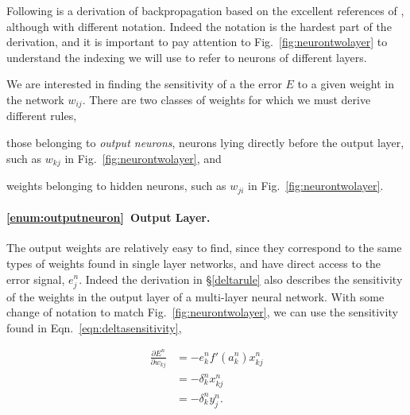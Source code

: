 \documentclass[thesis]{subfiles}
\begin{document}
Following is a derivation of backpropagation based on the excellent references of \citet{haykin1994neural,Bishop1995}, although with different notation. Indeed the notation is the hardest part of the derivation, and it is important to pay attention to Fig.~\ref{fig:neurontwolayer} to understand the indexing we will use to refer to neurons of different layers.

We are interested in finding the sensitivity of a the error $E$ to a given weight in the network $w_{ij}$. There are two classes of weights for which we must derive different rules, 
\begin{enumerate*}[label=(\textbf{\roman*})]
  \item \label{enum:outputneuron} those belonging to \emph{output neurons}, \ie neurons lying directly before the output layer, such as $w_{kj}$ in Fig.~\ref{fig:neurontwolayer}, and
  \item \label{enum:hiddenneuron} weights belonging to hidden neurons, such as $w_{ji}$ in Fig.~\ref{fig:neurontwolayer}.
\end{enumerate*}

\paragraph{\ref{enum:outputneuron}~Output Layer.}
The output weights are relatively easy to find, since they correspond to the same types of weights found in single layer networks, and have direct access to the error signal, \ie $e^n_j$. Indeed the derivation in \S\ref{deltarule} also describes the sensitivity of the weights in the output layer of a multi-layer neural network. With some change of notation to match Fig.~\ref{fig:neurontwolayer}, we can use the sensitivity found in Eqn.~\ref{eqn:deltasensitivity},

\begin{equation}
\begin{aligned}
    \frac{\partial E^n}{\partial w_{kj}} &= - e^n_k  f'\left( a^n_k \right) x^n_{kj}\\
    &= -\delta^n_k x^n_{kj}\\
    &= -\delta^n_k y^n_j.
\end{aligned}
\label{eqn:outputlayer}
\end{equation}
\end{document}
